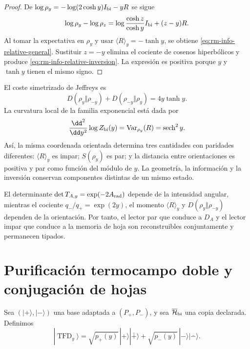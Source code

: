\begin{proof}
De \(\log\rho_y=-\log(2\cosh y)I_{\rm bi}-yR\) se sigue
\[
 \log\rho_y-\log\rho_z
 =\log\frac{\cosh z}{\cosh y}I_{\rm bi}+(z-y)R.
\]
Al tomar la expectativa en \(\rho_y\) y usar
\(\langle R\rangle_y=-\tanh y\), se obtiene
\cref{eq:rm-info-relative-general}. Sustituir \(z=-y\) elimina el cociente
de cosenos hiperb\'olicos y produce
\cref{eq:rm-info-relative-inversion}. La expresi\'on es positiva porque
\(y\) y \(\tanh y\) tienen el mismo signo.
\end{proof}

El coste simetrizado de Jeffreys es
\begin{equation}
 D(\rho_y\Vert\rho_{-y})
 +D(\rho_{-y}\Vert\rho_y)
 =4y\tanh y.
 \label{eq:rm-info-jeffreys}
\end{equation}
La curvatura local de la familia exponencial est\'a dada por
\begin{equation}
 \frac{\dd^2}{\dd y^2}\log Z_{\rm bi}(y)
 =\operatorname{Var}_{\rho_y}(R)
 =\operatorname{sech}^2y.
 \label{eq:rm-info-fisher}
\end{equation}
As\'i, la misma coordenada orientada determina tres cantidades con paridades
diferentes: \(\langle R\rangle_y\) es impar; \(S(\rho_y)\) es par; y la
distancia entre orientaciones es positiva y par como funci\'on del m\'odulo
de \(y\). La geometr\'ia, la informaci\'on y la inversi\'on conservan
componentes distintas de un mismo estado.

\begin{corollary}
El determinante
\(\det T_{A,y}=\exp(-2A_{\rm rad})\) depende de la intensidad angular,
mientras el cociente \(q_-/q_+=\exp(2y)\), el momento
\(\langle R\rangle_y\) y
\(D(\rho_y\Vert\rho_{-y})\) dependen de la orientaci\'on. Por tanto, el
lector par que conduce a \(D_A\) y el lector impar que conduce a la memoria
de hoja son reconstruibles conjuntamente y permanecen tipados.
\end{corollary}

\section{Purificaci\'on termocampo doble y conjugaci\'on de hojas}

Sea \((|+\rangle,|-\rangle)\) una base adaptada a
\((P_+,P_-)\), y sea \(\overline{\mathcal H}_{\rm bi}\) una copia
declarada. Definimos
\begin{equation}
 |\operatorname{TFD}_y\rangle
 =\sqrt{p_+(y)}\,|+\rangle|\bar +\rangle
 +\sqrt{p_-(y)}\,|-\rangle|\bar -\rangle.
 \label{eq:rm-info-tfd-bicapa}
\end{equation}

